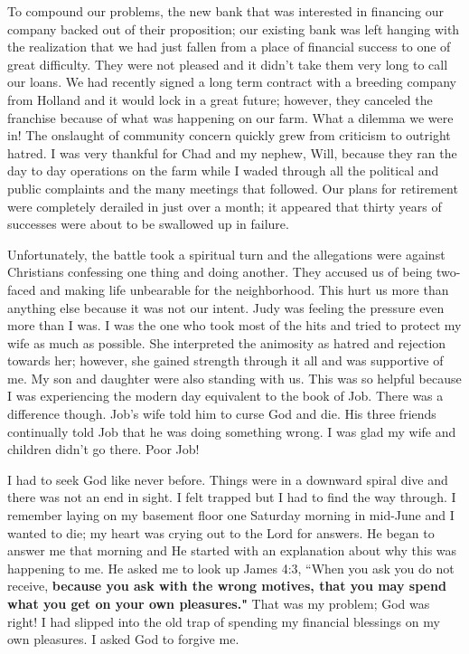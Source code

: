 \documentclass[twoside, 12pt]{book}
\begin{document}
To compound our problems, the new bank that was interested in financing our company backed out of their proposition; our existing bank was left hanging with the realization that we had just fallen from a place of financial success to one of great difficulty. They were not pleased and it didn’t take them very long to call our loans. We had recently signed a long term contract with a breeding company from Holland and it would lock in a great future; however, they canceled the franchise because of what was happening on our farm. What a dilemma we were in! The onslaught of community concern quickly grew from criticism to outright hatred. I was very thankful for Chad and my nephew, Will, because they ran the day to day operations on the farm while I waded through all the political and public complaints and the many meetings that followed. Our plans for retirement were completely derailed in just over a month; it appeared that thirty years of successes were about to be swallowed up in failure.

Unfortunately, the battle took a spiritual turn and the allegations were against Christians confessing one thing and doing another. They accused us of being two-faced and making life unbearable for the neighborhood. This hurt us more than anything else because it was not our intent. Judy was feeling the pressure even more than I was. I was the one who took most of the hits and tried to protect my wife as much as possible. She interpreted the animosity as hatred and rejection towards her; however, she gained strength through it all and was supportive of me. My son and daughter were also standing with us. This was so helpful because I was experiencing the modern day equivalent to the book of Job. There was a difference though. Job’s wife told him to curse God and die. His three friends continually told Job that he was doing something wrong. I was glad my wife and children didn't go there. Poor Job!

I had to seek God like never before. Things were in a downward spiral dive and there was not an end in sight. I felt trapped but I had to find the way through. I remember laying on my basement floor one Saturday morning in mid-June and I wanted to die; my heart was crying out to the Lord for answers. He began to answer me that morning and He started with an explanation about why this was happening to me. He asked me to look up James 4:3, “When you ask you do not receive, \textbf{because you ask with the wrong motives, that you may spend what you get on your own pleasures."} That was my problem; God was right! I had slipped into the old trap of spending my financial blessings on my own pleasures. I asked God to forgive me.
\end{document}

